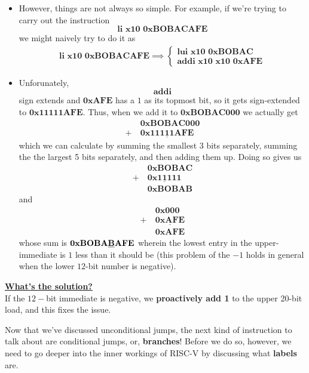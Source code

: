 \documentclass[11pt]{article}
\begin{document}
\begin{redbox}
  \begin{itemize}
    \item However, things are not always so simple. For example, if we're trying to carry out the instruction $$ \mathrm{\textbf{li x10 0xBOBACAFE}} $$ we might naively try to do it as 
    \begin{align*}
      \mathrm{\textbf{li x10 0xBOBACAFE}} \implies \begin{cases}
        \mathrm{\textbf{lui x10 0xBOBAC}} \\
        \mathrm{\textbf{addi x10 x10 0xAFE}}
      \end{cases}
    \end{align*}

    \item Unforunately, $$ \mathrm{\textbf{addi}} $$ sign extends and $\mathrm{\textbf{0xAFE}}$ has a $1$ as its topmost bit, so it gets sign-extended to $\mathrm{\textbf{0x11111AFE}}$. Thus, when we add it to $\mathrm{\textbf{0xBOBAC000}}$ we actually get 
    \begin{align*}
      &\mathrm{\textbf{0xBOBAC000}}\\
      +~&\mathrm{\underline{\textbf{0x11111AFE}}} 
    \end{align*} which we can calculate by summing the smallest 3 bits separately, summing the the largest 5 bits separately, and then adding them up. Doing so gives us 
    \begin{align*}
      &\mathrm{\textbf{0xBOBAC}}\\
      +~&\mathrm{\underline{\textbf{0x11111}}} \\
      &\mathrm{\textbf{0xBOBAB}}
    \end{align*} and     \begin{align*}
      &\mathrm{\textbf{0x000}}\\
      +~&\mathrm{\underline{\textbf{0xAFE}}}  \\
      &\mathrm{\textbf{0xAFE}}
    \end{align*} whose sum is $\mathrm{\textbf{0xBOBA\underline{B}AFE}}$ wherein the lowest entry in the upper-immediate is $1$ less than it should be (this problem of the $-1$ holds in general when the lower $12$-bit number is negative).
  \end{itemize}
\end{redbox}

\begin{bluebox}
  \underline{\textbf{What's the solution?}} \\
  If the $12-$bit immediate is negative, we \textbf{proactively add 1} to the upper 20-bit load, and this fixes the issue.
\end{bluebox} \vskip 1cm
Now that we've discussed unconditional jumps, the next kind of instruction to talk about are conditional jumps, or, \textbf{branches}! Before we do so, however, we need to go deeper into the inner workings of RISC-V by discussing what \textbf{labels} are.
\end{document}
